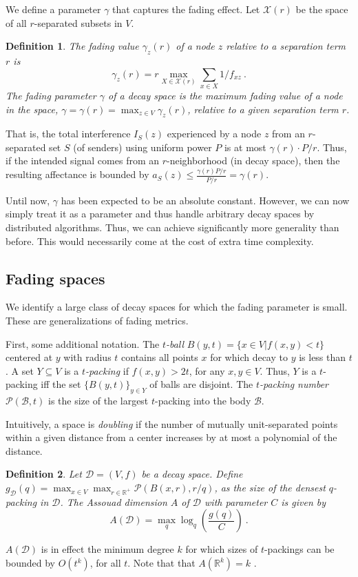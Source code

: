 \documentclass[11pt]{amsart}
\newtheorem{definition}{Definition}[section]
\def\calD{{\mathcal{D}}}
\def\calP{{\mathcal{P}}}
\def\calX{{\mathcal{X}}}
\newcommand{\reals}{\mathbb{R}}
\newcommand{\define}[1]{\emph{#1}} \newcommand{\degree}{^\circ}
\begin{document}
We define a parameter $\gamma$ that captures the fading effect.
Let $\calX(r)$ be the space of all $r$-separated subsets in $V$.
\begin{definition}
The \emph{fading value} $\gamma_z(r)$ of a node $z$
relative to a separation term $r$ is 
\[ \gamma_z(r) = r \max_{X \in \calX(r)} \sum_{x \in X} 1/f_{xz}\ . \]
The \emph{fading parameter} $\gamma$ of a decay space 
is the maximum fading value of a node in the space,
$\gamma = \gamma(r) = \max_{z \in V} \gamma_z(r)$,
relative to a given separation term $r$.
\label{defn:fading}
\end{definition}



That is, the total interference $I_S(z)$ experienced by a node $z$ from an $r$-separated set $S$ (of senders) using uniform power $P$ is at most $\gamma(r) \cdot P/r$. Thus, if the intended signal comes from an $r$-neighborhood (in decay space), then the resulting affectance is bounded by $a_S(z) \le \frac{\gamma(r) P/r}{P/r} = \gamma(r)$.

Until now, $\gamma$ has been expected to be an absolute constant.
However, we can now simply treat it as a parameter and thus
handle arbitrary decay spaces by distributed algorithms.
Thus, we can achieve significantly more generality than before.
This would necessarily come at the cost of extra time complexity.

\subsection{Fading spaces}

We identify a large class of decay spaces for which the fading parameter is small.
These are generalizations of fading metrics.


First, some additional notation.  The \emph{$t$-ball} $B(y,t) = \{x
\in V | f(x,y) < t\}$ centered at $y$ with radius $t$
contains all points $x$ for which decay to $y$ is less than $t$.  A
set $Y \subseteq V$ is a \emph{$t$-packing} if $f(x,y) > 2t$, for any
$x,y \in V$.  Thus, $Y$ is a $t$-packing iff the set
$\{B(y,t)\}_{y \in Y}$ of balls are disjoint.  The \emph{$t$-packing
  number} $\mathcal{P}(\mathcal{B}, t)$ is the size of the largest
$t$-packing into the body $\mathcal{B}$.  


Intuitively, a space is \emph{doubling} if the number of mutually unit-separated points 
within a given distance from a center increases by at most a polynomial of the distance.

\begin{definition}
Let $\calD = (V,f)$ be a decay space.
Define $g_\calD(q) = \max_{x \in V} \max_{r \in \reals^+}
\calP(B(x,r),r/q)$, as the size of the densest $q$-packing in $\calD$.
The \define{Assouad dimension $A$ of $\calD$ with parameter $C$} is
given by
  \[ A(\calD) = \max_q \log_q \left( \frac{g(q)}{C} \right)\ . \]
\end{definition}
$A(\calD)$ is in effect the minimum degree $k$ for which sizes of
$t$-packings can be bounded by $O(t^k)$, for all $t$.
Note that that $A(\mathbb{R}^k) = k$ \cite{Heinonen}.
\end{document}
